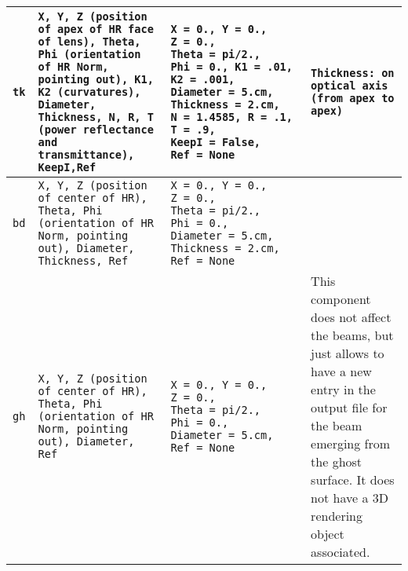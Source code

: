 \documentclass[a4paper, landscape]{article}
\begin{document}
\begin{tabular}{| p{.6cm} | p{8cm}| p{8cm} | p{8cm} |}
\tt{tk} & \tt{X}, \tt{Y}, \tt{Z} (position of apex of HR face of lens), \tt{Theta}, \tt{Phi} (orientation of HR Norm, pointing out), \tt{K1}, \tt{K2} (curvatures), \tt{Diameter},  \tt{Thickness}, \tt{N}, \tt{R}, \tt{T} (power reflectance and transmittance), \tt{KeepI},\tt{Ref} & \tt{X}~=~0., \tt{Y}~=~0., \tt{Z}~=~0., \tt{Theta}~=~pi/2., \tt{Phi}~=~0., \tt{K1}~=~.01, \tt{K2}~=~.001, \tt{Diameter}~=~5.cm,  \tt{Thickness}~=~2.cm, \tt{N}~=~1.4585, \tt{R}~=~.1, \tt{T}~=~.9, \tt{KeepI}~=~False,  \tt{Ref}~=~None & \tt{Thickness}: on optical axis (from apex to apex) \\ \hline

\tt{bd} & \tt{X}, \tt{Y}, \tt{Z} (position of center of HR), \tt{Theta}, \tt{Phi} (orientation of HR Norm, pointing out), \tt{Diameter},  \tt{Thickness}, \tt{Ref} & \tt{X}~=~0., \tt{Y}~=~0., \tt{Z}~=~0., \tt{Theta}~=~pi/2., \tt{Phi}~=~0., \tt{Diameter}~=~5.cm,  \tt{Thickness}~=~2.cm,  \tt{Ref}~=~None & \\ \hline

\tt{gh} & \tt{X}, \tt{Y}, \tt{Z} (position of center of HR), \tt{Theta}, \tt{Phi} (orientation of HR Norm, pointing out), \tt{Diameter}, \tt{Ref} & \tt{X}~=~0., \tt{Y}~=~0., \tt{Z}~=~0., \tt{Theta}~=~pi/2., \tt{Phi}~=~0., \tt{Diameter}~=~5.cm, \tt{Ref}~=~None & This component does not affect the beams, but just allows to have a new entry in the output file for the beam emerging from the ghost surface. It does not have a 3D rendering object associated. \\ \hline
\end{tabular}
\end{document}
